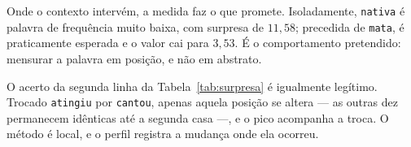 \begin{table}[H]
\centering
{}
\caption{Perfis de surpresa das duas frases, em nats. Em negrito, a posição que difere e as de
bigrama não observado.}
\label{tab:surpresa-perfil}
\end{table}

Onde o contexto intervém, a medida faz o que promete. Isoladamente, \texttt{nativa} é palavra
de frequência muito baixa, com surpresa de $11{,}58$; precedida de \texttt{mata}, é
praticamente esperada e o valor cai para $3{,}53$. É o comportamento pretendido: mensurar a
palavra em posição, e não em abstrato.

O acerto da segunda linha da Tabela~\ref{tab:surpresa} é igualmente legítimo. Trocado
\texttt{atingiu} por \texttt{cantou}, apenas aquela posição se altera --- as outras dez
permanecem idênticas até a segunda casa ---, e o pico acompanha a troca. O método é local, e o
perfil registra a mudança onde ela ocorreu.

